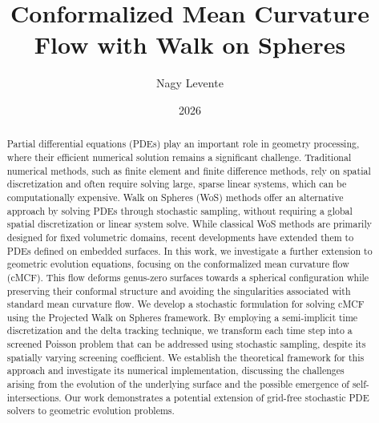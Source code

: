 \documentclass[
]{elteiktdk}[2024/04/26]
\title{Conformalized Mean Curvature Flow with Walk on Spheres}
\date{2026}
\author{Nagy Levente}
\affiliation{Assistant Professor}
\begin{document}
	
	
	
	\makecover
	\cleardoublepage
	\maketitle
	
	\tableofcontents
	\cleardoublepage
	
	\begin{abstract}
		Partial differential equations (PDEs) play an important role in geometry processing, where their efficient numerical solution remains a significant challenge. Traditional numerical methods, such as finite element and finite difference methods, rely on spatial discretization and often require solving large, sparse linear systems, which can be computationally expensive. Walk on Spheres (WoS) methods offer an alternative approach by solving PDEs through stochastic sampling, without requiring a global spatial discretization or linear system solve. While classical WoS methods are primarily designed for fixed volumetric domains, recent developments have extended them to PDEs defined on embedded surfaces. In this work, we investigate a further extension to geometric evolution equations, focusing on the conformalized mean curvature flow (cMCF). This flow deforms genus-zero surfaces towards a spherical configuration while preserving their conformal structure and avoiding the singularities associated with standard mean curvature flow. We develop a stochastic formulation for solving cMCF using the Projected Walk on Spheres framework. By employing a semi-implicit time discretization and the delta tracking technique, we transform each time step into a screened Poisson problem that can be addressed using stochastic sampling, despite its spatially varying screening coefficient. We establish the theoretical framework for this approach and investigate its numerical implementation, discussing the challenges arising from the evolution of the underlying surface and the possible emergence of self-intersections. Our work demonstrates a potential extension of grid-free stochastic PDE solvers to geometric evolution problems.
	\end{abstract}
	
\end{document}
